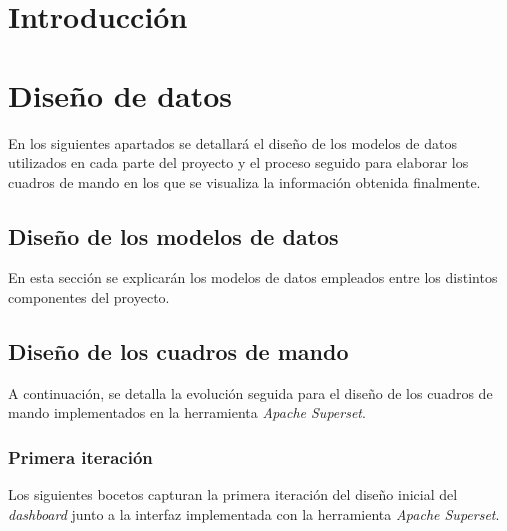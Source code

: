 
\section{Introducción}

\section{Diseño de datos}

En los siguientes apartados se detallará el diseño de los modelos de datos utilizados en cada parte del proyecto y el proceso seguido para elaborar los cuadros de mando en los que se visualiza la información obtenida finalmente.

\subsection{Diseño de los modelos de datos}

En esta sección se explicarán los modelos de datos empleados entre los distintos componentes del proyecto.

\subsection{Diseño de los cuadros de mando}

A continuación, se detalla la evolución seguida para el diseño de los cuadros de mando implementados en la herramienta \textit{Apache Superset}.

\subsubsection{Primera iteración}

Los siguientes bocetos capturan la primera iteración del diseño inicial del \textit{dashboard} junto a la interfaz implementada con la herramienta \textit{Apache Superset}.






